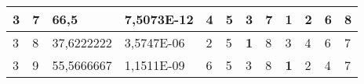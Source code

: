 \documentclass[conference]{IEEEtran}
\begin{document}
\begin{table*}[]
\begin{tabular}{|llll|llllllll|}
\multicolumn{1}{|l|}{3}                                                     & \multicolumn{1}{l|}{7}                                                        & \multicolumn{1}{l|}{66,5}                                                         & 7,5073E-12                     & \multicolumn{1}{l|}{4}                                                  & \multicolumn{1}{l|}{5}                                                  & \multicolumn{1}{l|}{3}                                                  & \multicolumn{1}{l|}{7}                                                  & \multicolumn{1}{l|}{\textbf{1}}                                         & \multicolumn{1}{l|}{2}                                                  & \multicolumn{1}{l|}{6}                                                  & 8                          \\ \hline
\multicolumn{1}{|l|}{3}                                                     & \multicolumn{1}{l|}{8}                                                        & \multicolumn{1}{l|}{37,6222222}                                                   & 3,5747E-06                     & \multicolumn{1}{l|}{2}                                                  & \multicolumn{1}{l|}{5}                                                  & \multicolumn{1}{l|}{\textbf{1}}                                         & \multicolumn{1}{l|}{8}                                                  & \multicolumn{1}{l|}{3}                                                  & \multicolumn{1}{l|}{4}                                                  & \multicolumn{1}{l|}{6}                                                  & 7                          \\ \hline
\multicolumn{1}{|l|}{3}                                                     & \multicolumn{1}{l|}{9}                                                        & \multicolumn{1}{l|}{55,5666667}                                                   & 1,1511E-09                     & \multicolumn{1}{l|}{6}                                                  & \multicolumn{1}{l|}{5}                                                  & \multicolumn{1}{l|}{3}                                                  & \multicolumn{1}{l|}{8}                                                  & \multicolumn{1}{l|}{\textbf{1}}                                         & \multicolumn{1}{l|}{2}                                                  & \multicolumn{1}{l|}{4}                                                  & 7                          \\ \hline

\end{tabular}
\end{table*}
\end{document}
